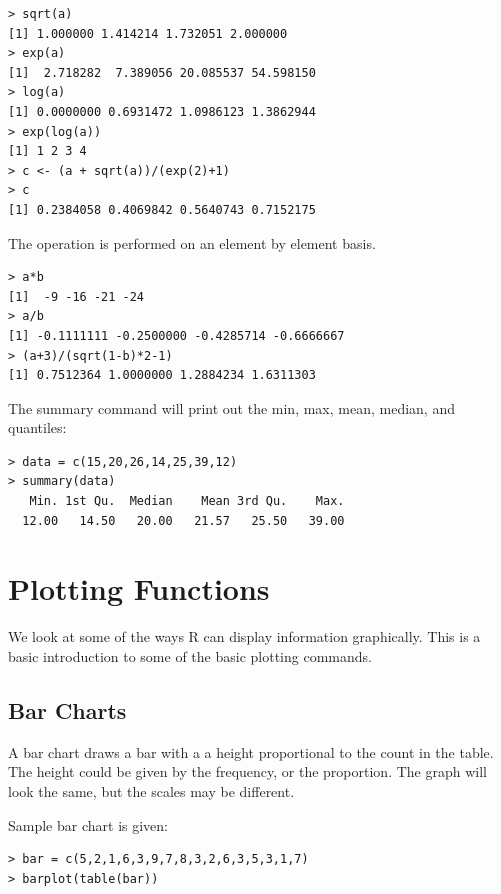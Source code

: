 \begin{lstlisting}[frame=single]
> sqrt(a)
[1] 1.000000 1.414214 1.732051 2.000000
> exp(a)
[1]  2.718282  7.389056 20.085537 54.598150
> log(a)
[1] 0.0000000 0.6931472 1.0986123 1.3862944
> exp(log(a))
[1] 1 2 3 4
> c <- (a + sqrt(a))/(exp(2)+1)
> c
[1] 0.2384058 0.4069842 0.5640743 0.7152175
\end{lstlisting}

The operation is performed on an element by element basis.  \newline

\begin{lstlisting}[frame=single]
> a*b
[1]  -9 -16 -21 -24
> a/b
[1] -0.1111111 -0.2500000 -0.4285714 -0.6666667
> (a+3)/(sqrt(1-b)*2-1)
[1] 0.7512364 1.0000000 1.2884234 1.6311303
\end{lstlisting}

\clearpage

The summary command will print out the min, max, mean, median, and quantiles:\\

\begin{lstlisting}[frame=single]
> data = c(15,20,26,14,25,39,12)
> summary(data)
   Min. 1st Qu.  Median    Mean 3rd Qu.    Max. 
  12.00   14.50   20.00   21.57   25.50   39.00 
\end{lstlisting}

\section{Plotting Functions}

We look at some of the ways R can display information graphically. This is a basic introduction to some of the basic plotting commands. 

\subsection{Bar Charts}

A bar chart draws a bar with a a height proportional to the count in the table. The height could be given by the
frequency, or the proportion. The graph will look the same, but the scales may be different.

Sample bar chart is given:

\begin{lstlisting}[frame=single ]
> bar = c(5,2,1,6,3,9,7,8,3,2,6,3,5,3,1,7)
> barplot(table(bar))
\end{lstlisting} 

